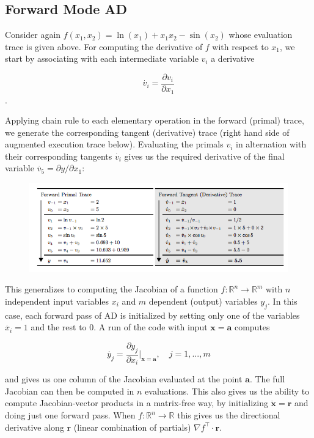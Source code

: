 \documentclass[11pt]{article}
\theoremstyle{definition}
\theoremstyle{plain}
\renewcommand{\v}[1]{\mathbf{#1}}
\renewcommand{\b}[1]{\mathbb{#1}}
\begin{document}
\newpage

\subsection{Forward Mode AD}

Consider again $f(x_1,x_2) = \ln(x_1) + x_1x_2 - \sin(x_2)$ whose evaluation trace is 
given above. For computing the derivative of $f$ with respect to $x_1$, we 
start by associating with each intermediate variable $v_i$ a derivative

$$ \dot{v_i} = \frac{\partial v_i}{\partial x_1} $$.

\noindent Applying chain rule to each elementary operation in the forward (primal)
trace, we generate the corresponding tangent (derivative) trace (right hand side of
augmented execution trace below). Evaluating the primals $v_i$ in alternation
with their corresponding tangents $\dot{v_i}$ gives us the required derivative
of the final variable $\dot{v_5} = \partial y / \partial x_1$:

\begin{figure}[H]
\includegraphics[width=12cm]{forward_dual}
\centering
\end{figure}


\noindent 
This generalizes to computing the Jacobian of a function $f: \b{R}^n \rightarrow \b{R}^m$
with $n$ independent input variables $x_i$ and $m$ dependent (output) variables $y_j$.
In this case, each forward pass of AD is initialized by setting only one of the variables
$\dot{x_i}=1$ and the rest to $0$. A run of the code with input $\v{x}=\v{a}$ computes

        $$ \dot{y_j} = \frac{\partial y_j}{\partial x_i} \rvert_{\v{x}=\v{a}}, 
            \quad j=1,...,m $$

\noindent and gives us one column of the Jacobian evaluated at the point $\v{a}$. The full
Jacobian can then be computed in $n$ evaluations. 
This also gives us the ability to compute Jacobian-vector products in a matrix-free way,
by initializing $\dot{\v{x}}=\v{r}$ and doing just one forward pass. When $f:\b{R}^n \rightarrow
\b{R}$ this gives us the directional derivative along $\v{r}$ (linear combination of partials)
$\nabla f^\top \cdot \v{r}$.\\
\end{document}

